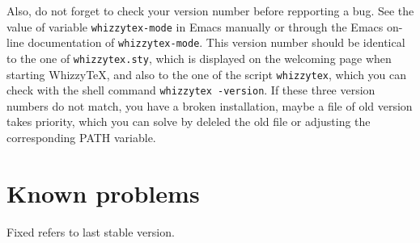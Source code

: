 \documentclass{article}
\begin{document}
Also, do not forget to check your version number before repporting a bug. 
See the value of variable \texttt{whizzytex-mode} in Emacs manually or
through the Emacs on-line documentation of \texttt{whizzytex-mode}. 
This version number should be identical to the one of
\texttt{whizzytex.sty}, which is displayed on the welcoming page when
starting WhizzyTeX, and also  to the one of the script \texttt{whizzytex},
which you can check with the shell command \texttt{whizzytex -version}.
If these three version numbers do not match, you have a broken
installation, maybe a file of old version takes priority, which you can
solve by deleled the old file or adjusting the corresponding PATH variable.


\section {Known problems}

Fixed refers to last stable version.
\def \FIXED {\textit{Fixed in versions $\ge$ {\version}}}
\end{document}
